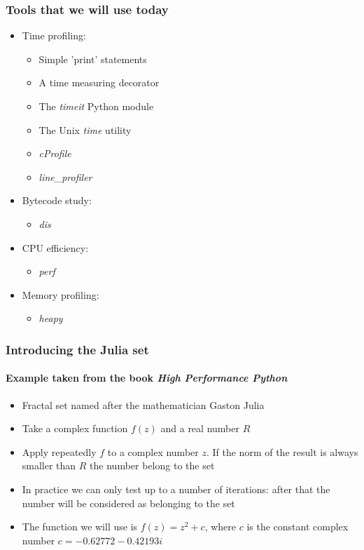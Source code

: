 \documentclass[9pt]{beamer}
\begin{document}
\begin{frame}
  \frametitle{Tools that we will use today}
  
  \begin{itemize}
   \item Time profiling:
   \begin{itemize}
     \item Simple 'print' statements
     \item A time measuring decorator
     \item The \emph{timeit} Python module
     \item The Unix \emph{time} utility
     \item \emph{cProfile}
     \item \emph{line\_profiler}
   \end{itemize}
   \smallskip
   \item Bytecode study:
   \begin{itemize}
     \item \emph{dis}
   \end{itemize}
   \smallskip
   \item CPU efficiency:
   \begin{itemize}
     \item \emph{perf}
   \end{itemize}
   \smallskip
   \item Memory profiling:
   \begin{itemize}
     \item \emph{heapy}
   \end{itemize}
  \end{itemize}
\end{frame}


\begin{frame}
  \frametitle{Introducing the Julia set}
  \framesubtitle{Example taken from the book \emph{High Performance Python}}
  \begin{itemize}
   \item Fractal set named after the mathematician Gaston Julia
   \item Take a complex function $f(z)$ and a real number $R$
   \item Apply repeatedly $f$ to a complex number $z$. If the norm of the 
         result is always smaller than $R$ the number belong to the set
   \item In practice we can only test up to a number of iterations: after that
         the number will be considered as belonging to the set
   \item The function we will use is $f(z) = z^2 + c$, where $c$ is the constant
         complex number $c = -0.62772 -0.42193i$      
  \end{itemize}
\end{frame}
\end{document}
